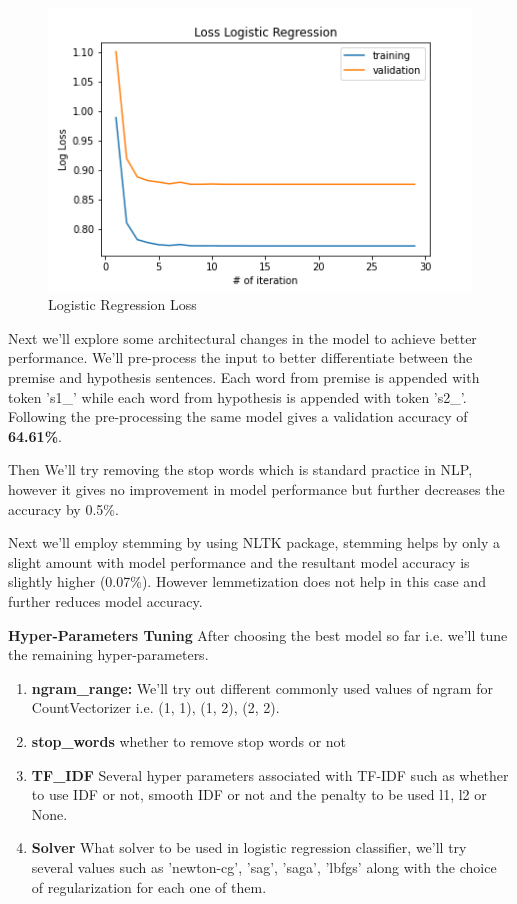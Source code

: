 \documentclass[10pt,a4paper]{article}
\begin{document}
\begin{figure}[h!]
\begin{center}
	\includegraphics[width=0.85\linewidth]{loss_lr.png}
	\caption{Logistic Regression Loss}
	\label{lrloss}
\end{center}
\end{figure}

	Next we'll explore some architectural changes in the model to achieve better performance. We'll pre-process the input to better differentiate between the premise and hypothesis sentences. Each word from premise is appended with token 's1\_' while each word from hypothesis is appended with token 's2\_'. Following the pre-processing the same model gives a validation accuracy of \textbf{64.61\%}. 

Then We'll try removing the stop words which is standard practice in NLP, however it gives no improvement in model performance but further decreases the accuracy by 0.5\%. 

Next we'll employ stemming by using NLTK package, stemming helps by only a slight amount with model performance and the resultant model accuracy is slightly higher (0.07\%). However lemmetization does not help in this case and further reduces model accuracy.
 
\textbf{Hyper-Parameters Tuning} After choosing the best model so far i.e. we'll tune the remaining hyper-parameters.
\begin{enumerate}
\item \textbf{ngram\_range:} We'll try out different commonly used values of ngram for CountVectorizer i.e. (1, 1),  (1, 2), (2, 2). 
\item \textbf{stop\_words} whether to remove stop words or not
\item \textbf{TF\_IDF} Several hyper parameters associated with TF-IDF such as whether to use IDF or not, smooth IDF or not and the penalty to be used l1, l2 or None.
\item \textbf{Solver} What solver to be used in logistic regression classifier, we'll try several values such as 'newton-cg', 'sag', 'saga', 'lbfgs' along with the choice of regularization for each one of them.
\end{enumerate}
\end{document}
